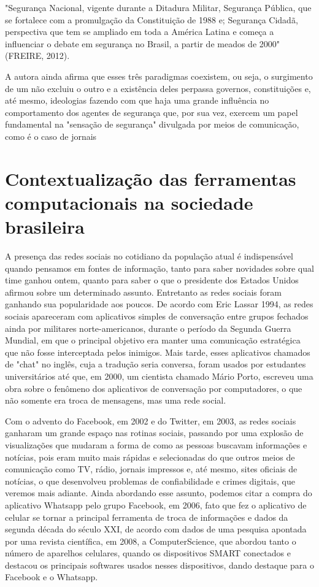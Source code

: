 "Segurança Nacional, vigente durante a Ditadura Militar, Segurança Pública, que se fortalece com a promulgação da Constituição de 1988 e; Segurança Cidadã, perspectiva que tem se ampliado em toda a América Latina e começa a influenciar o debate em segurança no Brasil, a partir de meados de 2000" (FREIRE, 2012).

A autora ainda afirma que esses três paradigmas coexistem, ou seja, o surgimento de um não excluiu o outro e a existência deles perpassa governos, constituições e, até mesmo, ideologias fazendo com que haja uma grande influência no comportamento dos agentes de segurança que, por sua vez, exercem um papel fundamental na "sensação de segurança" divulgada por meios de comunicação, como é o caso de jornais   

\section{Contextualização das ferramentas computacionais na sociedade brasileira}
A presença das redes sociais no cotidiano da população atual é indispensável quando pensamos em fontes de informação, tanto para saber novidades sobre qual time ganhou ontem, quanto para saber o que o presidente dos Estados Unidos afirmou sobre um determinado assunto. Entretanto as redes sociais foram ganhando sua popularidade aos poucos. De acordo com Eric Lassar 1994, as redes sociais apareceram com aplicativos simples de conversação entre grupos fechados ainda por militares norte-americanos, durante o período da Segunda Guerra Mundial, em que o principal objetivo era manter uma comunicação estratégica que não fosse interceptada pelos inimigos. Mais tarde, esses aplicativos chamados de "chat" no inglês, cuja a tradução seria conversa, foram usados por estudantes universitários até que, em 2000, um cientista chamado Mário Porto, escreveu uma obra sobre o fenômeno dos aplicativos de conversação por computadores, o que não somente era troca de mensagens, mas uma rede social.

Com o advento do Facebook, em 2002 e do Twitter, em 2003, as redes sociais ganharam um grande espaço nas rotinas sociais, passando por uma explosão de visualizações que mudaram a forma de como as pessoas buscavam informações e notícias, pois eram muito mais rápidas e selecionadas do que outros meios de comunicação como TV, rádio, jornais impressos e, até mesmo, sites oficiais de notícias, o que desenvolveu problemas de confiabilidade e crimes digitais, que veremos mais adiante. Ainda abordando esse assunto, podemos citar a compra do aplicativo Whatsapp pelo grupo Facebook, em 2006, fato que fez o aplicativo de celular se tornar a principal ferramenta de troca de informações e dados da segunda década do século XXI, de acordo com dados de uma pesquisa apontada por uma revista científica, em 2008, a ComputerScience, que abordou tanto o número de aparelhos celulares, quando os dispositivos SMART conectados e destacou os principais softwares usados nesses dispositivos, dando destaque para o Facebook e o Whatsapp.

